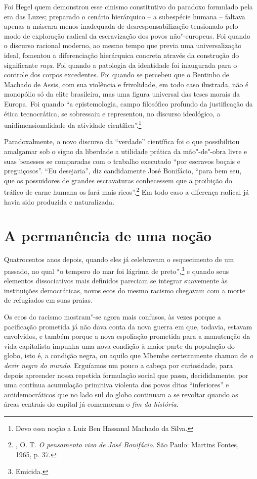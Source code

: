 Foi Hegel quem demonstrou esse cinismo constitutivo do paradoxo
formulado pela era das Luzes; preparado o cenário hierárquico -- a
subespécie humana -- faltava apenas a máscara menos inadequada de
desresponsabilização tensionado pelo modo de exploração radical da
escravização dos povos não"-europeus. Foi quando o discurso racional
moderno, ao mesmo tempo que previa uma universalização ideal, fomentou a
diferenciação hierárquica concreta através da construção do significante
\emph{raça}. Foi quando a patologia da identidade foi inaugurada para o
controle dos corpos excedentes. Foi quando se percebeu que o Bentinho de
Machado de Assis, com sua violência e frivolidade, em todo caso
ilustrada, não é monopólio só da elite brasileira, mas uma figura
universal das teses morais da Europa. Foi quando ``a epistemologia,
campo filosófico profundo da justificação da ética tecnocrática, se
sobressaiu e representou, no discurso ideológico, a unidimensionalidade
da atividade científica''.\footnote{Devo essa noção a Luiz Ben Hassanal
  Machado da Silva.}

Paradoxalmente, o novo discurso da ``verdade'' científica foi o que
possibilitou amalgamar sob o signo da liberdade a utilidade prática da
mão"-de"-obra livre e suas benesses se comparadas com o trabalho executado
``por escravos boçais e preguiçosos''. ``Eu desejaria'', diz
candidamente José Bonifácio, ``para bem seu, que os possuidores de
grandes escravaturas conhecessem que a proibição do tráfico de carne
humana os fará mais ricos''.\footnote{, O. T. \emph{O pensamento
  vivo de José Bonifácio}. São Paulo: Martins Fontes, 1965, p. 37.} Em
todo caso a diferença radical já havia sido produzida e naturalizada.

\chapter{A permanência de uma noção}

Quatrocentos anos depois, quando eles já celebravam o esquecimento de um
passado, no qual ``o tempero do mar foi lágrima de preto'',\footnote{Emicida.}
e quando seus elementos dissociativos mais definidos pareciam se
integrar suavemente às instituições democráticas, novos ecos do mesmo
racismo chegavam com a morte de refugiados em suas praias.

Os ecos do racismo mostram"-se
agora mais confusos, às vezes porque a pacificação prometida já não dava
conta da nova guerra em que, todavia, estavam envolvidos, e também
porque a nova espoliação prometida para a manutenção da vida capitalista
impunha uma nova condição à maior parte da população do globo, isto é, a
condição negra, ou aquilo que Mbembe certeiramente chamou de \emph{o
devir negro do mundo}. Erguíamos um pouco a cabeça por curiosidade, para
depois apreender nossa repetida formulação social que passa,
decididamente, por uma contínua acumulação primitiva violenta dos povos
ditos ``inferiores'' e antidemocráticos que no lado sul do globo
continuam a se revoltar quando as áreas centrais do capital já comemoram
o \emph{fim da história}.

